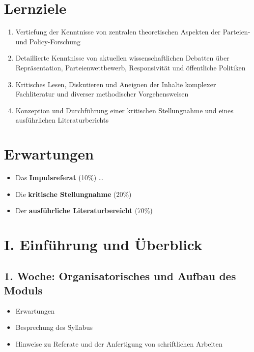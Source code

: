 \documentclass[abstract=on,parskip=full,headings=standardclasses,fontsize=11pt,paper=a4]{scrartcl}
\begin{document}
\section*{Lernziele}

\begin{enumerate}
\item Vertiefung der Kenntnisse von zentralen theoretischen Aspekten der Parteien- und Policy-Forschung
\item Detaillierte Kenntnisse von aktuellen wissenschaftlichen Debatten über Repräsentation, Parteienwettbewerb, Responsivität und öffentliche Politiken
\item  Kritisches Lesen, Diskutieren und Aneignen der Inhalte komplexer Fachliteratur und diverser methodischer Vorgehensweisen
\item Konzeption und Durchführung einer kritischen Stellungnahme und eines ausführlichen Literaturberichts
\end{enumerate}

\section*{Erwartungen}

\begin{itemize}
\item Das \textbf{Impulsreferat} (10\%) \dots
\item Die \textbf{kritische Stellungnahme} (20\%)
\item Der \textbf{ausführliche Literaturbereicht} (70\%) 
\end{itemize}

\tableofcontents

\section{I. Einführung und Überblick}


\subsection{1. Woche: Organisatorisches und Aufbau des Moduls}

\begin{itemize}
\item Erwartungen
\item Besprechung des Syllabus
\item Hinweise zu Referate und der Anfertigung von schriftlichen Arbeiten
\end{itemize}
\end{document}
